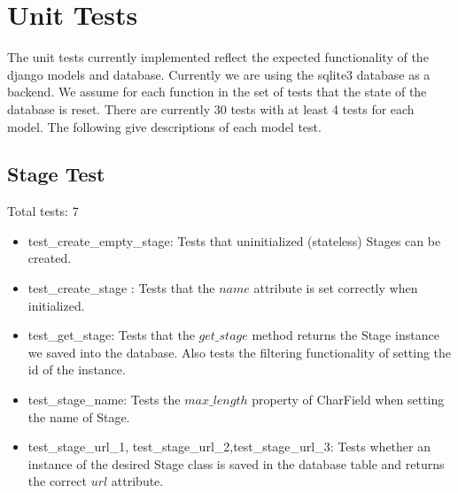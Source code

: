\documentclass[12pt,english]{scrartcl}
\begin{document}
\section{Unit Tests}
The unit tests currently implemented reflect the expected functionality of the django models and database.
Currently we are using the sqlite3 database as a backend. We assume for each function in the set of tests that the state of the database is reset.
There are currently 30 tests with at least 4 tests for each model. The following give descriptions of each model test. 

\subsection{Stage Test}
Total tests: 7
\begin{itemize}
\item test\_create\_empty\_stage: Tests that uninitialized (stateless) Stages can be created.

\item test\_create\_stage : Tests that the $name$ attribute is set correctly when initialized.
 
\item test\_get\_stage: Tests that the $get\_stage$ method returns the Stage instance we saved into the database. Also tests the filtering functionality of setting the id of the instance.

\item test\_stage\_name: Tests the $max\_length$ property of CharField when setting the name of Stage.

\item test\_stage\_url\_1, test\_stage\_url\_2,test\_stage\_url\_3: Tests whether an instance of the desired Stage class 
is saved in the database table and returns the correct $url$ attribute. 
\end{itemize} 
\end{document}
